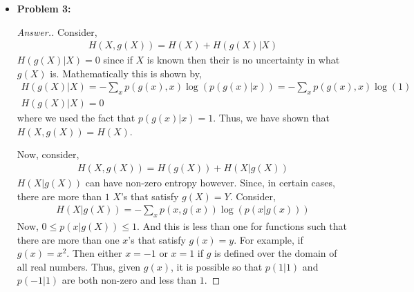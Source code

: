 \documentclass[10pt,twoside]{article}
\begin{document}
\begin{itemize}
\begin{proof}[Answer.]
    As defined in the book, even though $\log$ is not defined at $0$, we, by convention, defined $\log(0)$ as $0$. Rewriting, $p_i\log(\frac{1}{p_i})$ as $-p_i\log(p_i)$, we see that since $-p_i\log(p_i)\geq 0$, we will achieve the minimum for $p_i$ such that it evaluates to $0$.

    Clearly, $-p_i\log(p_i)=0$ for $p_i=0,1$. And so, $\mathbf{p}$ achieves this minimum if its components are any combination of $0,1$. Let $S=\set{\mathbf{p}: \text{for $i=1,\ldots, n$ } p_i=0,1}$
    
    Then $S$ contains every $\mathbf{p}$ such that $H(\mathbf{p}$ is minimized. Note that not every $v\in S$ is linearly independent.
    
    \end{proof}
    
    \item\textbf{Problem 3:} \newline
    \noindent\makebox[\linewidth]{\rule{18cm}{0.4pt}}
    \begin{proof}[Answer.]
    Consider, 
    \begin{gather*}
        H(X, g(X)) = H(X) + H(g(X)|X)
    \end{gather*}
    $H(g(X)|X) = 0$ since if $X$ is known then their is no uncertainty in what $g(X)$ is. Mathematically this is shown by,
    \begin{gather*}
        H(g(X)|X) = -\sum_x p(g(x),x)\log(p(g(x)|x)) = -\sum_x p(g(x),x)\log(1) \\
        H(g(X) | X) = 0
    \end{gather*}
    where we used the fact that $p(g(x)|x) = 1$. Thus, we have shown that\newline $H(X,g(X)) = H(X)$.

    Now, consider,
    \begin{gather*}
        H(X,g(X)) = H(g(X)) + H(X|g(X))
    \end{gather*}
    $H(X|g(X))$ can have non-zero entropy however. Since, in certain cases, there are more than $1$ $X$'s that satisfy $g(X) = Y$. Consider,
    \begin{gather*}
        H(X|g(X)) = -\sum_x p(x,g(x))\log(p(x|g(x)))
    \end{gather*}
    Now, $0\leq p(x|g(X)) \leq 1$. And this is less than one for functions such that there are more than one $x$'s that satisfy $g(x) = y$. For example, if $g(x) = x^2$. Then either $x=-1$ or $x=1$ if $g$ is defined over the domain of all real numbers. Thus, given $g(x)$, it is possible so that $p(1|1)$ and $p(-1|1)$ are both non-zero and less than $1$.


\end{proof}
\end{itemize}
\end{document}
